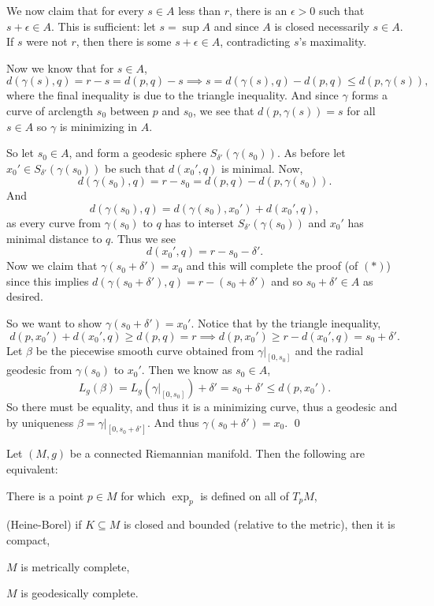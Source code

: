     We now claim that for every $s\in A$ less than $r$, there is an $\epsilon>0$ such that $s+\epsilon\in A$.
    This is sufficient: let $s=\sup A$ and since $A$ is closed necessarily $s\in A$.
    If $s$ were not $r$, then there is some $s+\epsilon\in A$, contradicting $s$'s maximality.

    Now we know that for $s\in A$,
    $$ d(\gamma(s),q) = r - s = d(p,q) - s \implies s = d(\gamma(s),q) - d(p,q) \leq d(p,\gamma(s)) , $$
    where the final inequality is due to the triangle inequality.
    And since $\gamma$ forms a curve of arclength $s_0$ between $p$ and $s_0$, we see that $d(p,\gamma(s))=s$ for all $s\in A$ so $\gamma$
    is minimizing in $A$.

    So let $s_0\in A$, and form a geodesic sphere $S_{\delta'}(\gamma(s_0))$.
    As before let $x_0'\in S_{\delta'}(\gamma(s_0))$ be such that $d(x_0',q)$ is minimal.
    Now,
    $$ d(\gamma(s_0),q) = r - s_0 = d(p,q) - d(p,\gamma(s_0)) . $$
    And
    $$ d(\gamma(s_0),q) = d(\gamma(s_0),x_0') + d(x_0',q) , $$
    as every curve from $\gamma(s_0)$ to $q$ has to interset $S_{\delta'}(\gamma(s_0))$ and $x_0'$ has minimal distance to $q$.
    Thus we see
    $$ d(x_0',q) = r - s_0 - \delta' . $$
    Now we claim that $\gamma(s_0+\delta')=x_0$ and this will complete the proof (of $(*)$) since this implies
    $d(\gamma(s_0+\delta'),q)=r-(s_0+\delta')$ and so $s_0+\delta'\in A$ as desired.

    So we want to show $\gamma(s_0+\delta')=x_0'$.
    Notice that by the triangle inequality,
    $$ d(p,x_0') + d(x_0',q) \geq d(p,q) = r \implies d(p,x_0') \geq r - d(x_0',q) = s_0 + \delta' . $$
    Let $\beta$ be the piecewise smooth curve obtained from $\gamma|_{[0,s_0]}$ and the radial geodesic from $\gamma(s_0)$ to $x_0'$.
    Then we know as $s_0\in A$,
    $$ L_g(\beta) = L_g(\gamma|_{[0,s_0]}) + \delta' = s_0 + \delta' \leq d(p,x_0') . $$
    So there must be equality, and thus it is a minimizing curve, thus a geodesic and by uniqueness $\beta=\gamma|_{[0,s_0+\delta']}$.
    And thus $\gamma(s_0+\delta')=x_0$.
    \qed

\eproof

\bthrm[title={Hopf-Rinow}]

    Let $(M,g)$ be a connected Riemannian manifold.
    Then the following are equivalent:
    \benum
        \item There is a point $p\in M$ for which $\exp_p$ is defined on all of $T_pM$,
        \item (Heine-Borel) if $K\subseteq M$ is closed and bounded (relative to the metric), then it is compact,
        \item $M$ is metrically complete,
        \item $M$ is geodesically complete.
    \eenum

